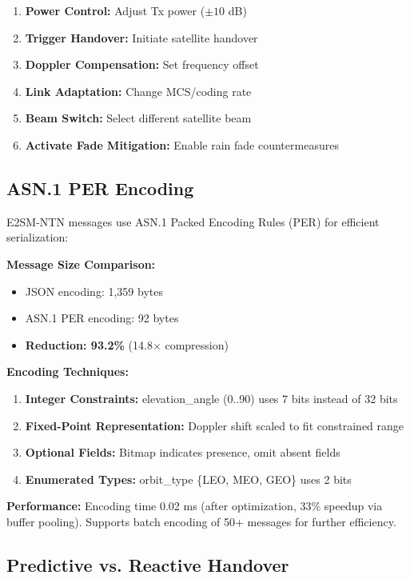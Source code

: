 \documentclass[conference]{IEEEtran}
\begin{document}
\begin{enumerate}
    \item \textbf{Power Control:} Adjust Tx power ($\pm 10$ dB)
    \item \textbf{Trigger Handover:} Initiate satellite handover
    \item \textbf{Doppler Compensation:} Set frequency offset
    \item \textbf{Link Adaptation:} Change MCS/coding rate
    \item \textbf{Beam Switch:} Select different satellite beam
    \item \textbf{Activate Fade Mitigation:} Enable rain fade countermeasures
\end{enumerate}

\subsection{ASN.1 PER Encoding}

E2SM-NTN messages use ASN.1 Packed Encoding Rules (PER) for efficient serialization:

\textbf{Message Size Comparison:}
\begin{itemize}
    \item JSON encoding: 1,359 bytes
    \item ASN.1 PER encoding: 92 bytes
    \item \textbf{Reduction: 93.2\%} (14.8$\times$ compression)
\end{itemize}

\textbf{Encoding Techniques:}
\begin{enumerate}
    \item \textbf{Integer Constraints:} elevation\_angle (0..90) uses 7 bits instead of 32 bits
    \item \textbf{Fixed-Point Representation:} Doppler shift scaled to fit constrained range
    \item \textbf{Optional Fields:} Bitmap indicates presence, omit absent fields
    \item \textbf{Enumerated Types:} orbit\_type \{LEO, MEO, GEO\} uses 2 bits
\end{enumerate}

\textbf{Performance:} Encoding time 0.02 ms (after optimization, 33\% speedup via buffer pooling). Supports batch encoding of 50+ messages for further efficiency.

\subsection{Predictive vs. Reactive Handover}
\end{document}
